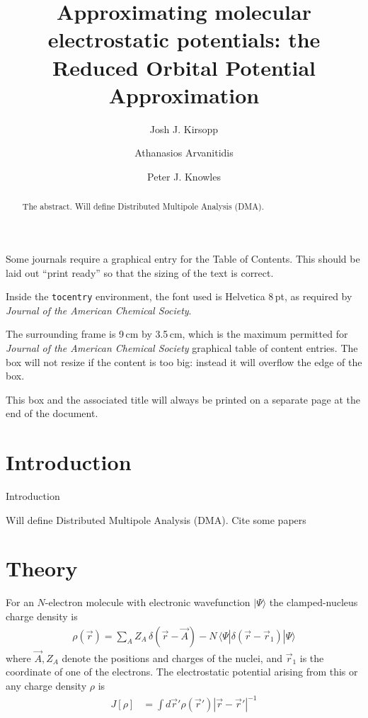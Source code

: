 \documentclass[journal=jacsat,manuscript=article]{achemso}
\author{Josh J. Kirsopp}
\author{Athanasios Arvanitidis}
\author{Peter J. Knowles}
\affiliation[Cardiff University]
{School of Chemistry, Cardiff University, Cardiff CF10 3AT, United Kingdom}
\title[Reduced Orbital Potential Approximation]
  {Approximating molecular electrostatic potentials: the Reduced Orbital Potential Approximation}
\begin{document}
\begin{tocentry}

Some journals require a graphical entry for the Table of Contents.
This should be laid out ``print ready'' so that the sizing of the
text is correct.

Inside the \texttt{tocentry} environment, the font used is Helvetica
8\,pt, as required by \emph{Journal of the American Chemical
Society}.

The surrounding frame is 9\,cm by 3.5\,cm, which is the maximum
permitted for  \emph{Journal of the American Chemical Society}
graphical table of content entries. The box will not resize if the
content is too big: instead it will overflow the edge of the box.

This box and the associated title will always be printed on a
separate page at the end of the document.

\end{tocentry}


\begin{abstract}
  The abstract.
  Will define
  Distributed Multipole Analysis (DMA).
\end{abstract}


\section{Introduction}
Introduction

  Will define
  Distributed Multipole Analysis (DMA)\cite{Stone1981,Stone1985,Stone2005}.
Cite some papers\cite{Knizia2015}

\section{Theory}

For an $N$-electron molecule with electronic wavefunction $|\Psi\rangle$ the clamped-nucleus charge density is
\begin{align}
    \rho(\vec r) = \sum_A Z_A \,\delta(\vec r - \vec A)
    -N \,\langle\Psi|\delta(\vec r-\vec r_1)|\Psi\rangle
\end{align}
where $\vec A, Z_A$ denote the positions and charges of the nuclei, and
$\vec r_1$ is the coordinate of one of the electrons.
The electrostatic potential arising from this or any charge density $\rho$ is
\begin{align}
    J[\rho] &= \int d\vec r' \rho(\vec r') |\vec r-\vec r'|^{-1}
\end{align}
\end{document}
